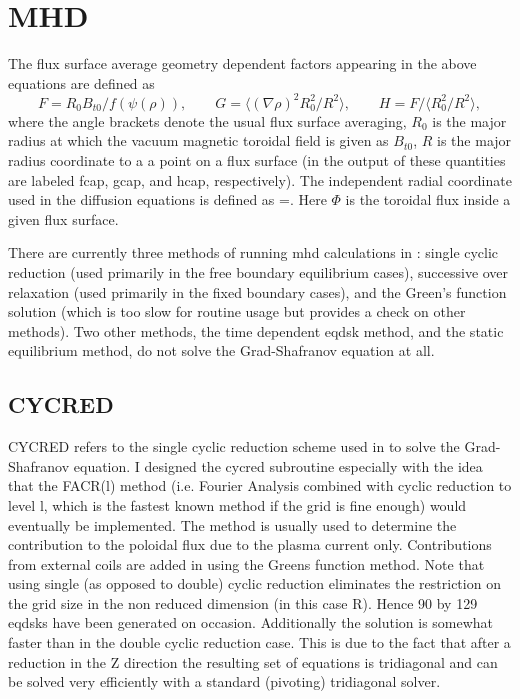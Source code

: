 \renewcommand{\textfraction}{0.15}
\renewcommand{\topfraction}{0.85}
\renewcommand{\bottomfraction}{0.65}
\renewcommand{\floatpagefraction}{0.60}

\section{MHD}

The flux surface average geometry dependent factors appearing in the above
equations are defined as 
$$  
 F=R_0 B_{t0}/f(\psi(\rho)),\qquad  
 G=\langle(\nabla\rho)^2R_0^2/R^2\rangle,\qquad   
 H = F/\langle R_0^2/R^2\rangle,
$$
where the angle brackets denote the usual flux surface averaging, $ R_0$ is the
major radius at which the vacuum magnetic toroidal field is given as $B_{t0}$,
$R$ is the major radius coordinate to a a point on a flux surface (in the output
of \ot these quantities are labeled fcap, gcap, and hcap, respectively). The
independent radial coordinate used in the diffusion equations is defined as
\beq
 \rho=.
\eeq
Here $\Phi $ is the toroidal flux inside a given flux surface.

There are currently three methods of running mhd calculations in \ot: single
cyclic reduction (used primarily in the free boundary equilibrium cases),
successive over relaxation (used primarily in the fixed boundary cases), and the
Green's function solution  (which is too slow for routine usage but provides a
check on  other methods). Two other methods, the time dependent eqdsk method,
and the static equilibrium method, do not solve the Grad-Shafranov equation at
all.

\subsection{CYCRED}

CYCRED refers to the single cyclic reduction scheme used in \ot to solve the
Grad-Shafranov equation. I designed the cycred subroutine especially with the
idea that the FACR(l) method (i.e. Fourier Analysis combined with cyclic
reduction to level l, which is the fastest known method if the grid is fine
enough) would eventually be implemented. The method is usually used to determine
the contribution to the poloidal flux due to the plasma current only.
Contributions from external coils are added in using the Greens function method.
Note that using single (as opposed to double) cyclic reduction eliminates the
restriction on the grid size in the non reduced dimension (in this case R). 
Hence 90 by 129 eqdsks have been generated on occasion. Additionally the
solution is somewhat faster than in the double cyclic reduction case. This is
due to the fact that after a reduction in the Z direction the resulting set of
equations is tridiagonal and can be solved very efficiently with a standard
(pivoting) tridiagonal solver.

